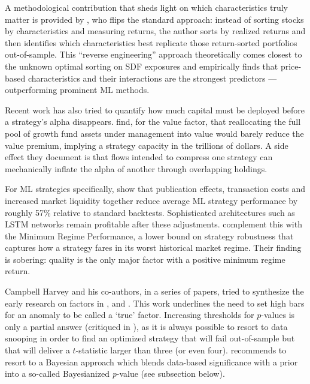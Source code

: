 A methodological contribution that sheds light on which characteristics truly matter is provided by \cite{seyfi2025essence}, who flips the standard approach: instead of sorting stocks by characteristics and measuring returns, the author sorts by realized returns and then identifies which characteristics best replicate those return-sorted portfolios out-of-sample. This ``reverse engineering'' approach theoretically comes closest to the unknown optimal sorting on SDF exposures and empirically finds that price-based characteristics and their interactions are the strongest predictors --- outperforming prominent ML methods.

Recent work has also tried to quantify how much capital must be deployed before a strategy's alpha disappears. \cite{davis2026erasing} find, for the value factor, that reallocating the full pool of growth fund assets under management into value would barely reduce the value premium, implying a strategy capacity in the trillions of dollars. A side effect they document is that flows intended to compress one strategy can mechanically inflate the alpha of another through overlapping holdings.

For ML strategies specifically, \cite{azevedo2025expected} show that publication effects, transaction costs and increased market liquidity together reduce average ML strategy performance by roughly 57\% relative to standard backtests. Sophisticated architectures such as LSTM networks remain profitable after these adjustments. \cite{alexander2024measuring} complement this with the Minimum Regime Performance, a lower bound on strategy robustness that captures how a strategy fares in its worst historical market regime. Their finding is sobering: quality is the only major factor with a positive minimum regime return.

Campbell Harvey and his co-authors, in a series of papers, tried to synthesize the early research on factors in \cite{harvey2016and}, \cite{harvey2017lucky} and \cite{harvey2017lucky}. This work underlines the need to set high bars for an anomaly to be called a `true' factor. Increasing thresholds for $p$-values is only a partial answer (critiqued in \cite{chen2020t}), as it is always possible to resort to data snooping in order to find an optimized strategy that will fail out-of-sample but that will deliver a $t$-statistic larger than three (or even four). \cite{harvey2017presidential} recommends to resort to a Bayesian approach which blends data-based significance with a prior into a so-called Bayesianized \textit{p}-value (see subsection below).

